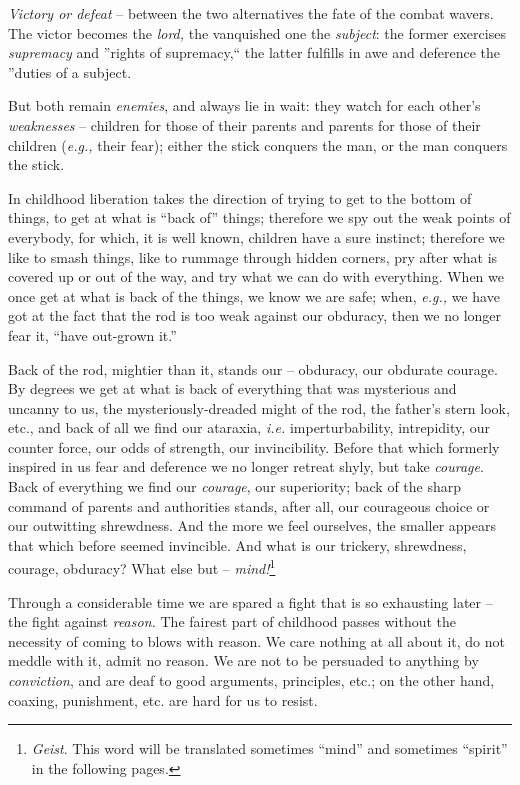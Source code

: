 \documentclass[12pt,a4paper]{book}
\begin{document}
\textit{Victory or defeat} -- between the two alternatives the fate of the 
combat wavers. The victor becomes the \textit{lord,} the vanquished one the 
\textit{subject}: the former exercises \textit{supremacy} and ''rights of 
supremacy,`` the latter fulfills in awe and deference the ''duties of a 
subject.

But both remain \textit{enemies}, and always lie in wait: they watch for each 
other's \textit{weaknesses} -- children for those of their parents and parents 
for those of their children (\textit{e.g.,} their fear); either the stick 
conquers the man, or the man conquers the stick.

In childhood liberation takes the direction of trying to get to the bottom of 
things, to get at what is ``back of'' things; therefore we spy out the weak 
points of everybody, for which, it is well known, children have a sure 
instinct; therefore we like to smash things, like to rummage through hidden 
corners, pry after what is covered up or out of the way, and try what we can 
do with everything. When we once get at what is back of the things, we know we 
are safe; when, \textit{e.g.,} we have got at the fact that the rod is too 
weak against our obduracy, then we no longer fear it, ``have out-grown it.''

Back of the rod, mightier than it, stands our -- obduracy, our obdurate 
courage. By degrees we get at what is back of everything that was mysterious 
and uncanny to us, the mysteriously-dreaded might of the rod, the father's 
stern look, etc., and back of all we find our ataraxia, \textit{i.e.} 
imperturbability, intrepidity, our counter force, our odds of strength, our 
invincibility. Before that which formerly inspired in us fear and deference we 
no longer retreat shyly, but take \textit{courage}. Back of everything we find 
our \textit{courage}, our superiority; back of the sharp command of parents 
and authorities stands, after all, our courageous choice or our outwitting 
shrewdness. And the more we feel ourselves, the smaller appears that which 
before seemed invincible. And what is our trickery, shrewdness, courage, 
obduracy? What else but -- \textit{mind!}\footnote{\textit{Geist}. This word 
will be translated sometimes ``mind'' and sometimes ``spirit'' in the 
following pages.}

Through a considerable time we are spared a fight that is so exhausting later 
-- the fight against \textit{reason.} The fairest part of childhood passes 
without the necessity of coming to blows with reason. We care nothing at all 
about it, do not meddle with it, admit no reason. We are not to be persuaded 
to anything by \textit{conviction}, and are deaf to good arguments, 
principles, etc.; on the other hand, coaxing, punishment, etc. are hard for us 
to resist.
\end{document}
